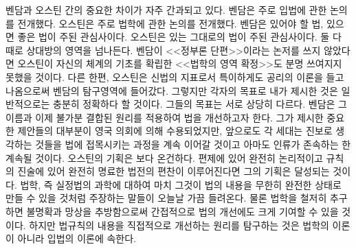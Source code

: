 벤담과 오스틴 간의 중요한 차이가 자주 간과되고 있다.
벤담은 주로 입법에 관한 논의를 전개했다.
오스틴은 주로 법학에 관한 논의를 전개했다.
벤담은 있어야 할 법, 있으면 좋은 법이 주된 관심사이다.
오스틴은 있는 그대로의 법이 주된 관심사이다.
둘 다 때로 상대방의 영역을 넘나든다.
벤담이 <<정부론 단편>>이라는 논저를 쓰지 않았다면
오스틴이 자신의 체계의 기초를 확립한
<<법학의 영역 확정>>도
분명 쓰여지지 못했을 것이다.
다른 한편, 오스틴은 신법의 지표로서
특이하게도 공리의 이론을 들고 나옴으로써
벤담의 탐구영역에 들어갔다.
그렇지만 각자의 목표로 내가 제시한 것은 일반적으로는 충분히 정확하다 할 것이다.
그들의 목표는 서로 상당히 다르다.
벤담은 그 이름과 이제 불가분 결합된 원리를 적용하여 법을 개선하고자 한다.
그가 제시한 중요한 제안들의 대부분이 영국 의회에 의해 수용되었지만,
앞으로도 각 세대는 진보로 생각하는 것들을 법에 접목시키는 과정을
계속 이어갈 것이고 아마도 인류가 존속하는 한 계속될 것이다.
오스틴의 기획은 보다 온건하다.
편제에 있어 완전히 논리적이고 규칙의 진술에 있어 완전히 명료한 법전의
편찬이 이루어진다면 그의 기획은 달성되는 것이다.
법학, 즉 실정법의 과학에 대하여
마치 그것이 법의 내용을 무한히 완전한 상태로 만들 수 있을 것처럼 주장하는
말들이 오늘날 가끔 들려온다.
물론 법학을 철저히 추구하면
불명확과 망상을 추방함으로써
간접적으로 법의 개선에도 크게 기여할 수 있을 것이다.
하지만 법규칙의 내용을 직접적으로 개선하는 원리를 탐구하는 것은
법학의 이론이 아니라 입법의 이론에 속한다.

